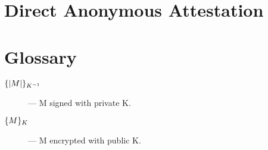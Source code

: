 \documentclass[10pt]{article}
\begin{document}
\section{Direct Anonymous Attestation}

\nocite{---::TCG-TPM-Specifi,Ryan:09:Introduction-to}

\section{Glossary}

\begin{description}
\item[$\{|M|\}_{K^{-1}}$] --- M signed with private K.
\item[$\{M\}_{K}$]  --- M encrypted with public K.
\end{description}


\end{document}
